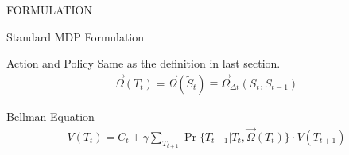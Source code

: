 \documentclass[10pt, conference, letterpaper]{IEEEtran}
\begin{document}
\begin{section}{FORMULATION}
\begin{subsection}{Standard MDP Formulation}
            \begin{subsubsection}{Action and Policy}
                Same as the definition in last section.
                \begin{align}
                    \vec{\Omega}(T_t) = \vec{\Omega}(\tilde{S}_t) \equiv \vec{\Omega}_{\Delta{t}}(S_t, S_{t-1})
                \end{align}
            \end{subsubsection}

            \begin{subsubsection}{Bellman Equation}
                \begin{align}
                    V(T_{t}) = C_t + \gamma \sum_{T_{t+1}} \Pr\{T_{t+1}|T_{t}, \vec{\Omega}(T_t)\} \cdot V(T_{t+1})
                \end{align}
            \end{subsubsection}
        \end{subsection}
        
    \end{section}
\end{document}
